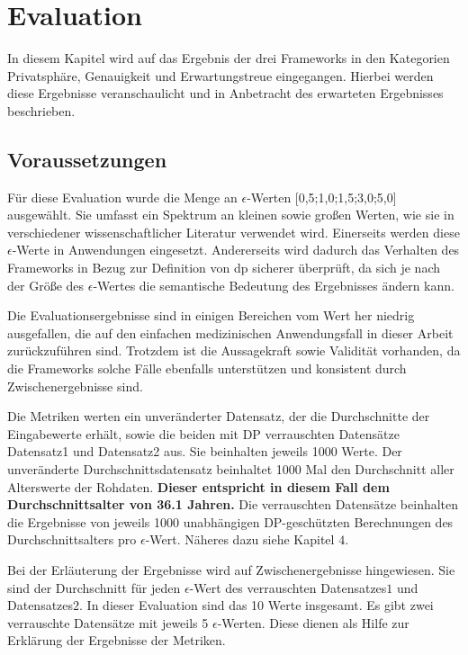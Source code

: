 \chapter{Evaluation}
In diesem Kapitel wird auf das Ergebnis der drei Frameworks in den Kategorien Privatsphäre, Genauigkeit und Erwartungstreue eingegangen. Hierbei werden diese Ergebnisse veranschaulicht und in Anbetracht des erwarteten Ergebnisses beschrieben.

\section{Voraussetzungen}
Für diese Evaluation wurde die Menge an $\epsilon$-Werten [0,5;1,0;1,5;3,0;5,0] ausgewählt. Sie umfasst ein Spektrum an kleinen sowie großen Werten, wie sie in verschiedener wissenschaftlicher Literatur verwendet wird. Einerseits werden diese $\epsilon$-Werte in Anwendungen eingesetzt. Andererseits wird dadurch das Verhalten des Frameworks in Bezug zur Definition von \gls{dp} sicherer überprüft, da sich je nach der Größe des  $\epsilon$-Wertes die semantische Bedeutung des Ergebnisses ändern kann.

Die Evaluationsergebnisse sind in einigen Bereichen vom Wert her niedrig ausgefallen, die auf den einfachen medizinischen Anwendungsfall in dieser Arbeit zurückzuführen sind. Trotzdem ist die Aussagekraft sowie Validität vorhanden, da die Frameworks solche Fälle ebenfalls unterstützen und konsistent durch Zwischenergebnisse sind.

Die Metriken werten ein unveränderter Datensatz, der die Durchschnitte der Eingabewerte erhält, sowie die beiden mit DP verrauschten Datensätze \glqq Datensatz1 \grqq und \glqq Datensatz2 \grqq aus. Sie beinhalten jeweils 1000 Werte. Der unveränderte Durchschnittsdatensatz beinhaltet 1000 Mal den Durchschnitt aller Alterswerte der Rohdaten. \textbf{Dieser entspricht in diesem Fall dem Durchschnittsalter von 36.1 Jahren.} Die verrauschten Datensätze beinhalten die Ergebnisse von jeweils 1000 unabhängigen DP-geschützten Berechnungen des Durchschnittsalters pro $\epsilon$-Wert. Näheres dazu siehe Kapitel $4$.

Bei der Erläuterung der Ergebnisse wird auf Zwischenergebnisse hingewiesen. Sie sind der Durchschnitt für jeden $\epsilon$-Wert des verrauschten Datensatzes$1$ und Datensatzes$2$. In dieser Evaluation sind das 10 Werte insgesamt. Es gibt zwei verrauschte Datensätze mit jeweils 5 $\epsilon$-Werten. Diese dienen als Hilfe zur Erklärung der Ergebnisse der Metriken. 

